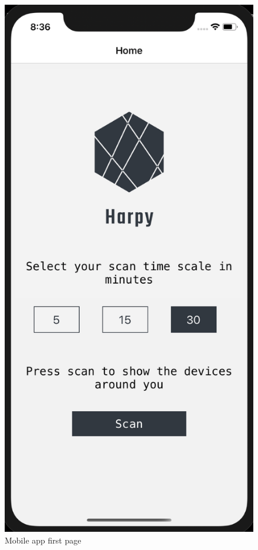 \documentclass{article}
\begin{document}
\begin{figure}[hbtp]
    \centering
    \includegraphics[scale=0.65]{frontEnd/homepage.png}
    \caption{Mobile app first page} 
\end{figure}
\pagebreak
\end{document}
